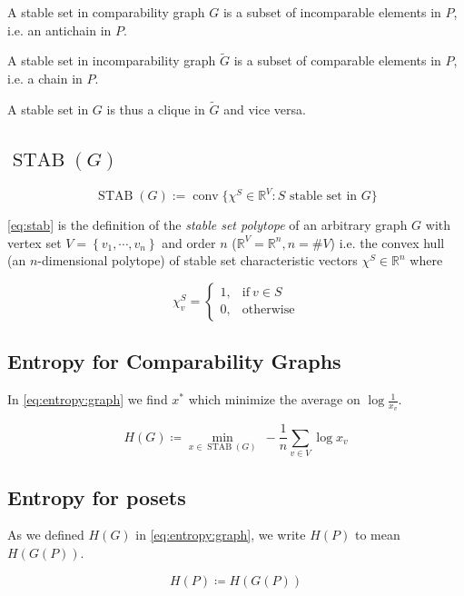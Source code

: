 A stable set in comparability graph ${G}$ is a subset of incomparable elements in ${P}$, i.e. an antichain in ${P}$.

A stable set in incomparability graph $\widetilde{G}$ is a subset of comparable elements in ${P}$, i.e. a chain in ${P}$.


A stable set in ${G}$ is thus a clique in $\widetilde{G}$ and vice versa.



\subsection{$\operatorname{STAB}(G)$}


\begin{equation}
\operatorname{STAB}(G) := \operatorname{conv}\{\chi^S \in \mathbb{R}^V : S\text{ stable set in }G\}
\label{eq:stab}
\end{equation}

\ref{eq:stab} is the definition of the \emph{stable set polytope} of an arbitrary graph $G$ with vertex set $V = \left\{{v_1, \cdots, v_n }\right\}$ and order $n$ ($\mathbb{R}^V = \mathbb{R}^n, n = \#V$) i.e. the convex hull (an $n$-dimensional polytope) of stable set characteristic vectors $\chi^S \in \mathbb{R}^n$ where

$$ \chi^S_v =\begin{cases}
      1, & \text{if}\ v \in S\\
      0, & \text{otherwise}
    \end{cases}$$



\subsection{Entropy for Comparability Graphs}

In \ref{eq:entropy:graph} we find $x^*$ which minimize the average on $\log \frac{1}{x_v}$.

\begin{equation}
{H}(G) \coloneqq \min_{x \in \operatorname{STAB}(G)}~ -\frac{1}{n} \sum_{v \in V} \log x_v
\label{eq:entropy:graph}
\end{equation}



\subsection{Entropy for posets}


As we defined ${H}(G)$ in \ref{eq:entropy:graph}, we write ${H}(P)$ to mean ${H}(G(P))$.

\begin{equation}
{H}(P) \coloneqq {H}({G}(P))
\label{eq:entropy:poset}
\end{equation}
